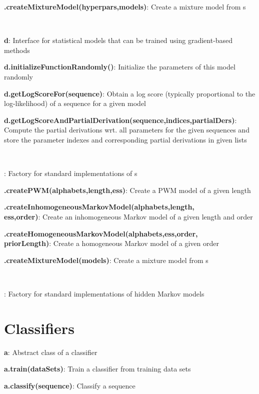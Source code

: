 \documentclass[10pt]{scrartcl}
\newcommand{\entry}[3]{{\bfseries #1#2}: #3}
\begin{document}
\begin{flushleft}
\entry{\TrainSMFactory}{.createMixtureModel(hyperpars,models)}{Create a mixture model from \TrainSM s}

~

\entry{\DiffSM}{ d}{Interface for statistical models that can be trained using gradient-based methods}

\entry{d}{.initializeFunctionRandomly()}{Initialize the parameters of this model randomly}

\entry{d}{.getLogScoreFor(sequence)}{Obtain a log score (typically proportional to the log-likelihood) of a sequence for a given model}

\entry{d}{.getLogScoreAndPartialDerivation(sequence,indices,partialDers)}{Compute the partial derivations wrt. all parameters for the given sequences and store the parameter indexes and corresponding partial derivations in given lists}

~

%
\entry{\DiffSMFactory}{}{Factory for standard implementations of \DiffSM s}

\entry{\DiffSMFactory}{.createPWM(alphabets,length,ess)}{Create a PWM model of a given length}

\entry{\DiffSMFactory}{.createInhomogeneousMarkovModel(alphabets,length,\\ess,order)}{Create an inhomogeneous Markov model of a given length and order}

\entry{\DiffSMFactory}{.createHomogeneousMarkovModel(alphabets,ess,order,\\priorLength)}{Create a homogeneous Markov model of a given order}

\entry{\DiffSMFactory}{.createMixtureModel(models)}{Create a mixture model from \DiffSM s}

~

\entry{\HMMFactory}{}{Factory for standard implementations of hidden Markov models}

\section{Classifiers}

\entry{\AbstractClassifier}{ a}{Abstract class of a classifier}

\entry{a}{.train(dataSets)}{Train a classifier from training data sets}

\entry{a}{.classify(sequence)}{Classify a sequence}


\end{flushleft}
\end{document}
